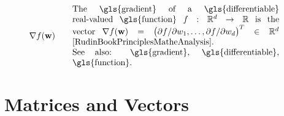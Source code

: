 \begin{align}
	 &\nabla f(\weights) & \quad & \parbox{.70\textwidth}{The \gls{gradient} of a \gls{differentiable} real-valued \gls{function} 
	 	$f: \mathbb{R}^{\featuredim}\rightarrow \mathbb{R}$ is the vector 
	 	$\nabla f(\weights) = \big( {\partial f}/{\partial \weight_{1}}, \ldots, {\partial f}/{\partial \weight_{\featuredim}}  \big)^{T} \in \mathbb{R}^{\featuredim}$ \cite[Ch. 9]{RudinBookPrinciplesMatheAnalysis}.
		\\ See also: \gls{gradient}, \gls{differentiable}, \gls{function}.}   \nonumber
\end{align} 
\section*{Matrices and Vectors} 

